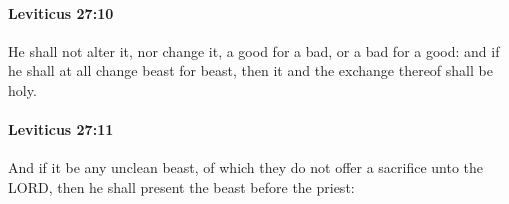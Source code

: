 		\paragraph{Leviticus 27:10} %
			\label{LEVITICUS-27-10}

			He shall not alter it, nor change it, a good for a bad, or a bad for a good: and if he shall at all change beast for beast, then it and the exchange thereof shall be holy.


		\paragraph{Leviticus 27:11} %
			\label{LEVITICUS-27-11}

			And if it be any unclean beast, of which they do not offer a sacrifice unto the LORD, then he shall present the beast before the priest:



